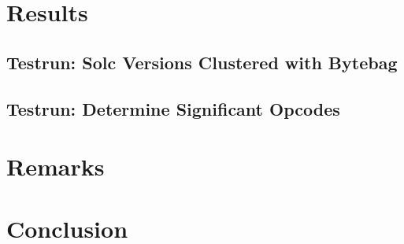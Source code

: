 \documentclass[]{article}
\begin{document}
\section{Results}
\subsection{Testrun: Solc Versions Clustered with Bytebag}


\subsection{Testrun: Determine Significant Opcodes \label{sec:runOpcodes}}




\section{Remarks}


\section{Conclusion}


\printbibliography
\end{document}
